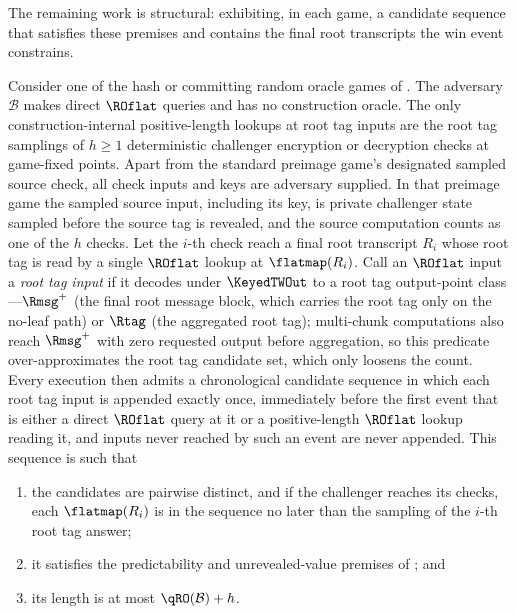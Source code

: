 The remaining work is structural: exhibiting, in each game, a candidate
sequence that satisfies these premises and contains the final root
transcripts the win event constrains.

\begin{lemma}
\label{lem:root-candidate-seq}
Consider one of the hash or committing random oracle games of
. The adversary $\mathcal{B}$ makes direct
$\ROflat$ queries and has no construction oracle. The only
construction-internal positive-length lookups at root tag inputs are the
root tag samplings of $h \geq 1$ deterministic challenger encryption or
decryption checks at game-fixed points. Apart from the standard preimage
game's designated sampled source check, all check inputs and keys are
adversary supplied. In that preimage game the sampled source input,
including its key, is private challenger state sampled before the source
tag is revealed, and the source computation counts as one of the $h$
checks. Let the $i$-th check reach a final root transcript $R_i$ whose
root tag is read by a single $\ROflat$ lookup at $\flatmap(R_i)$. Call an
$\ROflat$ input a \emph{root tag input} if it decodes under
$\KeyedTWOut$ to a root tag output-point class---$\Rmsg^+$ (the final
root message block, which carries the root tag only on the no-leaf path)
or $\Rtag$ (the aggregated root tag); multi-chunk computations also reach
$\Rmsg^+$ with zero requested output before aggregation, so this predicate
over-approximates the root tag candidate set, which only loosens the
count. Every execution
then admits a chronological candidate sequence in which each root tag
input is appended exactly once, immediately before the first event that is
either a direct $\ROflat$ query at it or a positive-length $\ROflat$
lookup reading it, and inputs never reached by such an event are never
appended. This sequence is such that
\begin{enumerate}
\item the candidates are pairwise distinct, and if the challenger reaches
  its checks, each $\flatmap(R_i)$ is in the sequence no later than the
  sampling of the $i$-th root tag answer;
\item it satisfies the predictability and unrevealed-value premises of
  ; and
\item its length is at most $\qRO(\mathcal{B}) + h$.
\end{enumerate}
\end{lemma}

